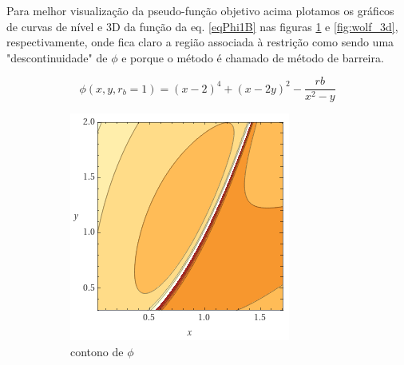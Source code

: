 \documentclass[10pt, a4paper]{article}
\begin{document}
Para melhor visualiza\c c\~ao da pseudo-fun\c c\~ao objetivo acima plotamos os gr\'aficos de curvas de n\'ivel e 3D da fun\c c\~ao da eq. \ref{eqPhi1B} nas figuras \ref{fig:wolf_contour} e \ref{fig:wolf_3d}, respectivamente, onde fica claro a regi\~ao associada \`a restri\c c\~ao como sendo uma "descontinuidade" de $\phi$ e porque o m\'etodo \'e chamado de m\'etodo de barreira.

\begin{equation} \label{eqPhi1B}
      \phi (x,y, r_b=1) = (x-2)^4 + (x-2y)^2 - \frac{rb}{x^2-y}
\end{equation}

\begin{figure}[H]
      \centering
      \begin{subfigure}{0.35\textwidth}
            \includegraphics[width=\textwidth]{wolf_contour.PNG}
            \caption{contono de $\phi$}
            \label{fig:wolf_contour}
      \end{subfigure}
      \begin{subfigure}{0.45\textwidth}
            \centering

\end{subfigure}
\end{figure}
\end{document}
